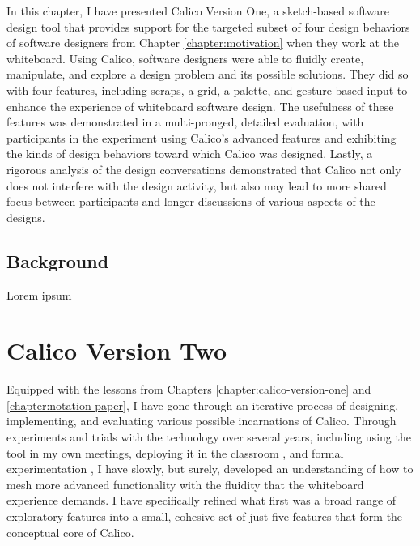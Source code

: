 \documentclass[12pt,fleqn]{ucithesis}
\begin{document}
In this chapter, I have presented Calico Version One, a sketch-based software design tool that provides support for the targeted subset of four design behaviors of software designers from Chapter \ref{chapter:motivation} when they work at the whiteboard. Using Calico, software designers were able to fluidly create, manipulate, and explore a design problem and its possible solutions. They did so with four features, including scraps, a grid, a palette, and gesture-based input to enhance the experience of whiteboard software design. The usefulness of these features was demonstrated in a multi-pronged, detailed evaluation, with participants in the experiment using Calico's advanced features and exhibiting the kinds of design behaviors toward which Calico was designed. Lastly, a rigorous analysis of the design conversations demonstrated that Calico not only does not interfere with the design activity, but also may lead to more shared focus between participants and longer discussions of various aspects of the designs.

 \newpage 
\label{chapter:notation-paper}

\section{Background}

Lorem ipsum 

 \newpage 
 \newpage \chapter{Calico Version Two}
\label{chapter:calico-version-two}

Equipped with the lessons from Chapters \ref{chapter:calico-version-one} and \ref{chapter:notation-paper}, I have gone through an iterative process of designing, implementing, and evaluating various possible incarnations of Calico. Through experiments and trials with the technology over several years, including using the tool in my own meetings, deploying it in the classroom \cite{Loksa2013}, and formal experimentation \cite{mangano2012design}, I have slowly, but surely, developed an understanding of how to mesh more advanced functionality with the fluidity that the whiteboard experience demands. I have specifically refined what first was a broad range of exploratory features into a small, cohesive set of just five features that form the conceptual core of Calico.
\end{document}
